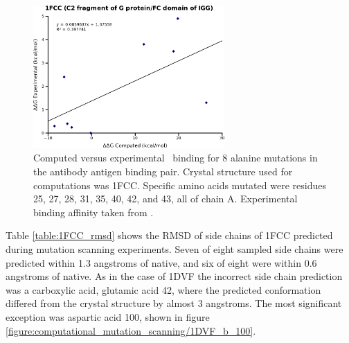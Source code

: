 \begin{figure}[h]
    \centering
    \includegraphics[width=0.65\textwidth]{figures/1fcc.png}
    \caption{Computed versus experimental \ddg\ binding for 8 alanine mutations in the antibody antigen binding pair.
    Crystal structure used for computations was 1FCC.
    Specific amino acids mutated were residues 25, 27, 28, 31, 35, 40, 42, and 43, all of chain A.
    Experimental binding affinity taken from \protect\cite{thorn2001asedb}.}
    \label{figure:computational_mutation_scanning/1FCC_ddg}
\end{figure}



Table \ref{table:1FCC_rmsd} shows the RMSD of side chains of 1FCC predicted during mutation scanning experiments.
Seven of eight sampled side chains were predicted within 1.3 angstroms of native, and six of eight were within 0.6 angstroms of native.
As in the case of 1DVF the incorrect side chain prediction was a carboxylic acid, glutamic acid 42, where the predicted conformation differed from the crystal structure by almost 3 angstroms.
The most significant exception was aspartic acid 100, shown in figure \ref{figure:computational_mutation_scanning/1DVF_b_100}.


